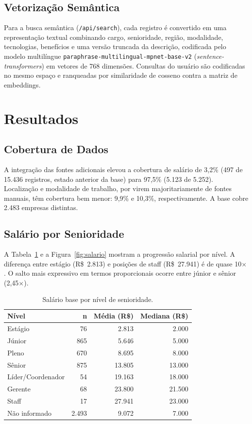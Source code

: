 \documentclass[10pt,twocolumn]{article}
\begin{document}
\subsection{Vetorização Semântica}

Para a busca semântica (\texttt{/api/search}), cada registro é convertido em
uma representação textual combinando cargo, senioridade, região, modalidade,
tecnologias, benefícios e uma versão truncada da descrição, codificada pelo
modelo multilíngue \texttt{paraphrase-multilingual-mpnet-base-v2}
(\emph{sentence-transformers}) em vetores de 768 dimensões. Consultas do
usuário são codificadas no mesmo espaço e ranqueadas por similaridade de
cosseno contra a matriz de embeddings.

\section{Resultados}

\subsection{Cobertura de Dados}

A integração das fontes adicionais elevou a cobertura de salário de 3,2\%
(497 de 15.436 registros, estado anterior da base) para 97,5\%
(5.123 de 5.252). Localização e modalidade de trabalho, por virem
majoritariamente de fontes manuais, têm cobertura bem menor: 9,9\% e 10,3\%,
respectivamente. A base cobre 2.483 empresas distintas.

\subsection{Salário por Senioridade}

A Tabela~\ref{tab:seniority} e a Figura~\ref{fig:salario} mostram a progressão
salarial por nível. A diferença entre estágio (R\$~2.813) e posições de staff
(R\$~27.941) é de quase 10$\times$. O salto mais expressivo em termos
proporcionais ocorre entre júnior e sênior (2,45$\times$).

\begin{table}[H]
\centering
\small
\caption{Salário base por nível de senioridade.}
\label{tab:seniority}
\begin{tabular}{@{}lrrr@{}}
\toprule
\textbf{Nível} & \textbf{n} & \textbf{Média (R\$)} & \textbf{Mediana (R\$)} \\
\midrule
Estágio              & 76  & 2.813  & 2.000 \\
Júnior                & 865 & 5.646  & 5.000 \\
Pleno                 & 670 & 8.695  & 8.000 \\
Sênior                & 875 & 13.805 & 13.000 \\
Líder/Coordenador     & 54  & 19.163 & 18.000 \\
Gerente               & 68  & 23.800 & 21.500 \\
Staff                 & 17  & 27.941 & 23.000 \\
\midrule
Não informado         & 2.493 & 9.072 & 7.000 \\
\bottomrule
\end{tabular}
\end{table}
\end{document}
